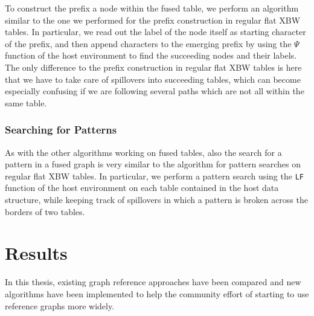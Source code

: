 \documentclass[a4paper,12pt,twoside,BCOR=10mm]{scrbook}
\begin{document}
To construct the prefix a node within the fused table, 
we perform an algorithm similar to the one we performed for the prefix construction 
in regular flat XBW tables. 
In particular, we read out the label of the node itself as starting character of the prefix, 
and then append characters to the emerging prefix by using the $\Psi$ function of the host environment to 
find the succeeding nodes and their labels. 
The only difference to the prefix construction in regular flat XBW tables 
is here that we have to take care of spillovers into succeeding tables, 
which can become especially confusing if we are following several paths which are not all 
within the same table.


\subsection{Searching for Patterns}

As with the other algorithms working on fused tables, also the search for a pattern 
in a fused graph is very similar to the algorithm for pattern searches on regular flat XBW tables. 
In particular, we perform a pattern search using the \texttt{LF} function of the host environment on each table contained 
in the host data structure, while keeping track of spillovers in which a pattern is broken 
across the borders of two tables.


\chapter{Results}
%

In this thesis, existing graph reference approaches have been compared 
and new algorithms have been implemented to help the community effort 
of starting to use reference graphs more widely.
\end{document}
